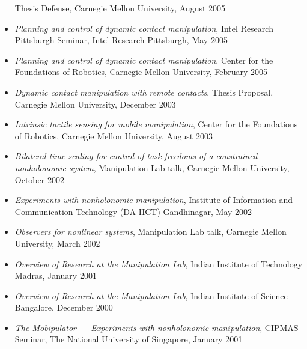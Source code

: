 \documentclass[10pt]{article}
\begin{document}
\begin{itemize}
Thesis Defense,  Carnegie Mellon University, August 2005
\item \textit{Planning and control of dynamic contact manipulation},
Intel Research Pittsburgh Seminar, Intel Research Pittsburgh, May 2005
\item \textit{Planning and control of dynamic contact manipulation},
Center for the Foundations of Robotics,  Carnegie Mellon University, February 2005
\item \textit{Dynamic contact manipulation with remote contacts},
Thesis Proposal,  Carnegie Mellon University, December 2003
\item \textit{Intrinsic tactile sensing for mobile manipulation},
Center for the Foundations of Robotics,  Carnegie Mellon University, August 2003
\item \textit{Bilateral time-scaling for control of task freedoms of a constrained nonholonomic system},
Manipulation Lab talk, Carnegie Mellon University, October 2002
\item \textit{Experiments with nonholonomic manipulation},
Institute of Information and Communication Technology (DA-IICT) Gandhinagar, May 2002
\item \textit{Observers for nonlinear systems},
Manipulation Lab talk, Carnegie Mellon University, March 2002
\item \textit{Overview of Research at the Manipulation Lab},
Indian Institute of Technology Madras, January 2001
\item \textit{Overview of Research at the Manipulation Lab},
Indian Institute of Science Bangalore, December 2000
\item \textit{The Mobipulator ---  Experiments with nonholonomic manipulation},
CIPMAS Seminar, The National University of Singapore, January 2001

\end{itemize}
\end{document}
